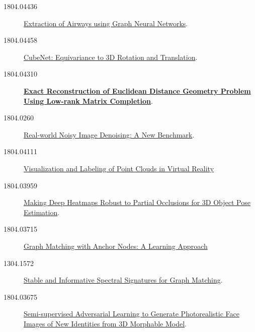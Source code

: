 \begin{description}
\item[1804.04436] \href{https://arxiv.org/abs/1804.04436}{Extraction of Airways
    using Graph Neural Networks}.

\item[1804.04458] \href{https://arxiv.org/abs/1804.04458}{CubeNet: Equivariance
    to 3D Rotation and Translation}.

\item[1804.04310] \textbf{\href{https://arxiv.org/abs/1804.04310}{Exact
      Reconstruction of Euclidean Distance Geometry Problem Using Low-rank
      Matrix Completion}}.

\item[1804.0260] \href{https://arxiv.org/abs/1804.02603}{Real-world Noisy Image
    Denoising: A New Benchmark}.

\item[1804.04111] \href{https://arxiv.org/abs/1804.04111}{Visualization and
    Labeling of Point Clouds in Virtual Reality}

\item[1804.03959] \href{https://arxiv.org/abs/1804.03959}{Making Deep Heatmaps
    Robust to Partial Occlusions for 3D Object Pose Estimation}.

\item[1804.03715] \href{https://arxiv.org/abs/1804.03715}{Graph Matching with
    Anchor Nodes: A Learning Approach}

\item[1304.1572] \href{https://arxiv.org/abs/1304.1572}{Stable and Informative
    Spectral Signatures for Graph Matching}.

\item[1804.03675] \href{https://arxiv.org/abs/1804.03675}{Semi-supervised
    Adversarial Learning to Generate Photorealistic Face Images of New
    Identities from 3D Morphable Model}.
  
\end{description}